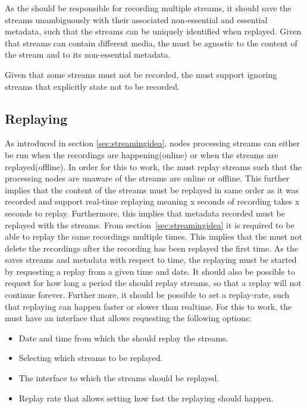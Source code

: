As the \hist{} should be responsible for recording multiple streams, it should save the streams unambiguously with their associated non-essential and essential metadata, such that the streams can be uniquely identified when replayed.
Given that streams can contain different media, the \hist{} must be agnostic to the content of the stream and to its non-essential metadata.

Given that some streams must not be recorded, the  must support ignoring streams that explicitly state not to be recorded.


\subsection{Replaying}
As introduced in section \ref{sec:streamingidea}, nodes processing streams can either be run when the recordings are happening(online) or when the streams are replayed(offline). In order for this to work, the  must replay streams such that the processing nodes are unaware of the streams are online or offline. This further implies that the content of the streams must be replayed in same order as it was recorded and support real-time replaying meaning x seconds of recording takes x seconds to replay. Furthermore, this implies that metadata recorded must be replayed with the streams. From section~\ref{sec:streamingidea} it is required to be able to replay the same recordings multiple times. This implies that the  must not delete the recordings after the recording has been replayed the first time.
As the  saves streams and metadata with respect to time, the replaying must be started by requesting a replay from a given time and date. It should also be possible to request for how long a period the  should replay streams, so that a replay will not continue forever.
Further more, it should be possible to set a replay-rate, such that replaying can happen faster or slower than realtime. For this to work, the  must have an interface that allows requesting the following options:

\begin{itemize}
	\item Date and time from which the  should replay the streams.
	\item Selecting which streams to be replayed.
	\item The interface to which the streams should be replayed.
	\item Replay rate that allows setting how fast the replaying should happen. 
\end{itemize}

